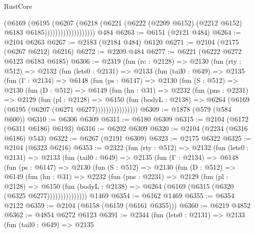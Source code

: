 \begin{lexlean}{RustCore}
\begin{coremodule}
                              (@6169
                                (@6195
                                  (@6207
                                    (@6218
                                      (@6221
                                        (@6222
                                          (@2209 @6152)
                                          (@2212 @6152)
                                          @6183
                                          @6185)))))))))))))))))))
    @484
@6263 := @6151 (@2121 @484)
@6264 := @2104 @6263
@6267 := @2183 (@2184 @484) @6120
@6271 := @2104 (@2175 (@6267 @6212) @6216)
@6272 := @2209 @484
@6277 := @6221 (@6222 @6272 @6123 @6183 @6185)
@6306 := @2319
    (fun (rc : @2128) =>
    @2130
      (fun (rty : @512) =>
      @2132
        (fun (lets0 : @2131) =>
        @2133
          (fun (tail0 : @649) =>
          @2135
            (fun (Γ : @2134) =>
            @6148
              (fun (ps : @6147) =>
              @2130
                (fun (S : @512) =>
                @2130
                  (fun (D : @512) =>
                  @6149
                    (fun (hn : @31) =>
                    @2232
                      (fun (pns : @2231) =>
                      @2129
                        (fun (pl : @2128) =>
                        @6150
                          (fun (bodyL : @2138) =>
                          @6264 (@6169 (@6195 (@6207 (@6271 @6277))))))))))))))))
@6309 := @1878 (@579 (@584 @600))
@6310 := @6306 @6309
@6311 := @6180 @6309
@6315 := @2104 (@6172 (@6311 @6186) @6193)
@6316 := @6202 @6309
@6320 := @2104 (@2234 (@6316 @6186) @543)
@6322 := @6267 (@2191 @6309)
@6323 := @2175 @6322
@6325 := @2104 (@6323 @6216)
@6353 := @2322
    (fun (rty : @512) =>
    @2132
      (fun (lets0 : @2131) =>
      @2133
        (fun (tail0 : @649) =>
        @2135
          (fun (Γ : @2134) =>
          @6148
            (fun (ps : @6147) =>
            @2130
              (fun (S : @512) =>
              @2130
                (fun (D : @512) =>
                @6149
                  (fun (hn : @31) =>
                  @2232
                    (fun (pns : @2231) =>
                    @2129
                      (fun (pl : @2128) =>
                      @6150
                        (fun (bodyL : @2138) =>
                        @6264 (@6169 (@6315 (@6320 (@6325 @6277)))))))))))))))
    @1469
@6354 := @6162 @1469
@6355 := @6354 @2122
@6359 := @2104 (@6158 (@6159 (@6161 @6355)))
@6360 := @6219 @4852
@6362 := @4854 @6272 @6123
@6391 := @2344
    (fun (lets0 : @2131) =>
    @2133
      (fun (tail0 : @649) =>
      @2135

\end{coremodule}
\end{lexlean}
